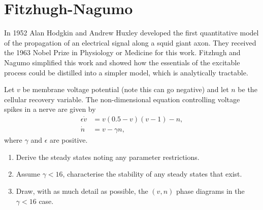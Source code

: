 \documentclass[]{article}
\begin{document}
\section{Fitzhugh-Nagumo}
In 1952 Alan Hodgkin and Andrew Huxley developed the first quantitative model of the propagation of an electrical signal along a squid giant axon. They received the 1963 Nobel Prize in Physiology or Medicine for this work. Fitzhugh and Nagumo simplified this work and showed how the essentials of the excitable process could be distilled into a simpler model, which is analytically tractable.

Let $v$ be membrane voltage potential (note this can go negative) and let $n$ be the cellular recovery variable. The non-dimensional equation controlling voltage spikes in a nerve are given by
\begin{align}
\epsilon \dot{v}&=v(0.5-v)(v-1)-n,\label{v}\\
\dot{n}&=v-\gamma n,\label{n}
\end{align}
where $\gamma$ and $\epsilon$ are positive.
\begin{enumerate}
\item Derive the steady states noting any parameter restrictions.
\item Assume $\gamma<16$, characterise the stability of any steady states that exist.
\item Draw, with as much detail as possible, the $(v,n)$ phase diagrams in the $\gamma<16$ case.
\end{enumerate}
\end{document}

